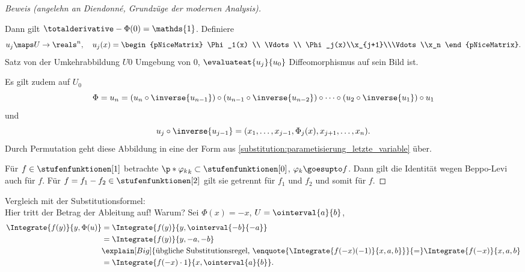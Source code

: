 \begin{proof}[Beweis (angelehn an Diendonné, Grundzüge der modernen Analysis)]
\begin{enumerate}[label=\rechtsklammer{\arabic*.}]
    Dann gilt \( \totalderivative-{\Phi}(0)=\mathds{1} \). Definiere
    \begin{equation*}
      u_j\maps U\to \reals^n,\quad u_j(x)=\begin{pNiceMatrix} \Phi_1(x) \\ \Vdots \\ \Phi_j(x)\\x_{j+1}\\\Vdots\\x_n \end{pNiceMatrix}.
    \end{equation*}
    Satz von der Umkehrabbildung \timplies \texists \( U0 \) Umgebung von \( 0\), \sd \( \evaluateat{u_j}{u_0} \) Diffeomorphismus auf sein Bild ist.
  \end{enumerate}
  Es gilt zudem auf \( U_0 \)
  \begin{equation*}
    \Phi=u_n=(u_n\circ \inverse{u_{n-1}})\circ (u_{n-1}\circ \inverse{u_{n-2}})\circ\dotsb\circ (u_2\circ \inverse{u_1})\circ u_1
  \end{equation*}
  und
  \begin{equation*}
    u_j\circ \inverse{u_{j-1}}=(x_1,\dotsc,x_{j-1},\Phi_j(x),x_{j+1},\dotsc,x_n).
  \end{equation*}
  Durch Permutation geht diese Abbildung in eine der Form aus \ref{substitution:parametisierung_letzte_variable} über.

  Für \( f\in \stufenfunktionen[1] \) betrachte \( \p*{\varphi_k}_k\subset \stufenfunktionen[0] \), \( \varphi_k\goesupto f \). Dann gilt die Identität wegen Beppo-Levi auch für \( f \). Für \( f=f_1-f_2\in \stufenfunktionen[2] \) gilt sie getrennt für \( f_1 \) und \( f_2 \) und somit für \( f \).

  
\end{proof}
Vergleich mit der Substitutionsformel:\\
Hier tritt der Betrag der Ableitung auf! Warum? Sei \zb \( \Phi(x)=-x \), \( U=\ointerval{a}{b} \),
\begin{align*}
  \Integrate{f(y)}{y,\Phi(u)}&=\Integrate{f(y)}{y,\ointerval{-b}{-a}}\\
  &=\Integrate{f(y)}{y,-a,-b}\\
  &\explain[Big]{\text{übgliche Substitutionsregel, \enquote{\( \Integrate{f(-x)(-1)}{x,a,b} \)}}}{=}\Integrate{f(-x)}{x,a,b}\\
  &=\Integrate{f(-x)\cdot 1}{x,\ointerval{a}{b}}.
\end{align*}
